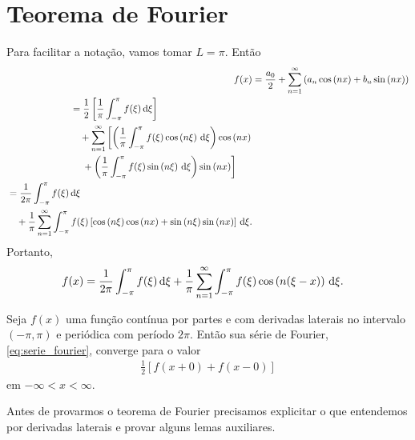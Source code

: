 \section{Teorema de Fourier}
Para facilitar a nota\c{c}\~{a}o, vamos tomar $L = \pi$. Ent\~{a}o
\begin{align*}
    f(x) &= \frac{a_0}{2} + \sum_{n = 1}^\infty \left( a_n \cos\left( n x \right) + b_n \sin\left( n x \right) \right) \\
    \begin{split}
        &= \frac{1}{2} \left[ \frac{1}{\pi} \int_{-\pi}^\pi f(\xi) \, \mathrm{d}\xi \right] \\ 
        &\quad {}+ \sum_{n = 1}^\infty \left[ \left( \frac{1}{\pi} \int_{-\pi}^\pi f(\xi) \cos\left( n \xi \right) \, \mathrm{d}\xi \right) \cos\left( n x \right) \right. \\
        &\quad \left. {}+ \left( \frac{1}{\pi} \int_{-\pi}^\pi f(\xi) \sin\left( n \xi \right) \, \mathrm{d}\xi \right) \sin\left( n x \right) \right]
    \end{split} \\
    \begin{split}
        &= \frac{1}{2\pi} \int_{-\pi}^\pi f(\xi) \, \mathrm{d}\xi \\
        &\quad {}+ \frac{1}{\pi} \sum_{n = 1}^\infty \int_{-\pi}^\pi f(\xi) \left[ \cos\left( n \xi \right) \cos\left( n x \right) + \sin\left( n \xi \right) \sin\left( n x \right) \right] \, \mathrm{d}\xi.
    \end{split}
\end{align*}
Portanto,
\begin{align}
    f(x) &= \frac{1}{2\pi} \int_{-\pi}^\pi f(\xi) \, \mathrm{d}\xi + \frac{1}{\pi} \sum_{n = 1}^\infty \int_{-\pi}^\pi f(\xi) \cos\left( n (\xi - x) \right) \, \mathrm{d}\xi.
    \label{eq:serie_fourier}
\end{align}

\begin{teo}[Fourier] \label{teo:fourier}
    Seja $f(x)$ uma fun\c{c}\~{a}o cont\'{i}nua por partes e com derivadas laterais no intervalo $(-\pi, \pi)$ e peri\'{o}dica com per\'{i}odo $2\pi$. Ent\~{a}o sua s\'{e}rie de Fourier, \eqref{eq:serie_fourier}, converge para o valor
    \begin{align*}
        \frac{1}{2} \left[ f(x + 0) + f(x - 0) \right]
    \end{align*}
    em $-\infty < x < \infty$.
\end{teo}

Antes de provarmos o teorema de Fourier precisamos explicitar o que entendemos por derivadas laterais e provar alguns lemas auxiliares.

